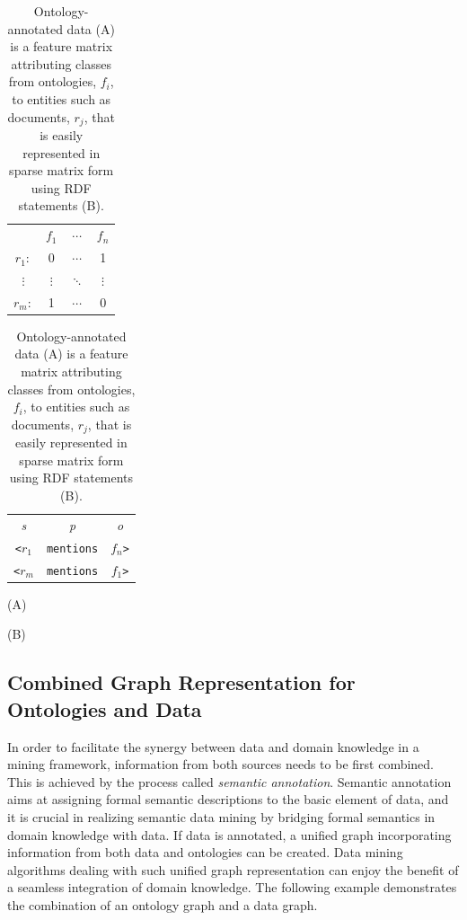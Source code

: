 \begin{table}[ht]
\begin{minipage}[b]{0.38\linewidth}\begin{flushright}
\begin{tabular}{ c | c | c | c |}
\cline{2-4}
	~   & $f_1$	    & $\cdots$  & $f_n$   \\
\cline{2-4}
$r_1:$	&  0  	& $\cdots$   &    1  \\
\cline{2-4}
$\vdots$& $\vdots$  & $\ddots$  & $\vdots$\\
\cline{2-4}
$r_m:$	&  1  	& $\cdots$   &    0  \\
\cline{2-4}
\end{tabular}
\end{flushright}
\end{minipage}
\hfill
\begin{minipage}[b]{0.4\linewidth}
\begin{tabular}{c c c}
\emph{s}&   \emph{p}&  \emph{o}\\
\texttt{<$r_1$}   &    \texttt{mentions}   &  \texttt{$f_n$>}\\
\texttt{<$r_m$}   &    \texttt{mentions}   &  \texttt{$f_1$>}\\
\end{tabular}
\end{minipage}
\begin{minipage}[c]{0.4\linewidth}\centering
\vspace{0.2cm}\hspace{1.5cm}(A)
\end{minipage}
\begin{minipage}[c]{0.4\linewidth}\centering
\hspace{2.6cm}(B)
\end{minipage}
\caption{\label{tbl:binary-rel} Ontology-annotated data (A) is a feature matrix attributing classes from ontologies, $f_i$, to entities such as documents, $r_j$, that is easily represented in sparse matrix form using RDF statements (B).}
\end{table}

\subsection{Combined Graph Representation for Ontologies and Data}
In order to facilitate the synergy between data and domain knowledge in a mining framework, information from both sources needs to be first combined. This is achieved by the process called \emph{semantic annotation}. Semantic annotation aims at assigning formal semantic descriptions to the basic element of data, and it is crucial in realizing semantic data mining by bridging formal semantics in domain knowledge with data. If data is annotated, a unified graph incorporating information from both data and ontologies can be created. Data mining algorithms dealing with such unified graph representation can enjoy the benefit of a seamless integration of domain knowledge. The following example demonstrates the combination of an ontology graph and a data graph.

